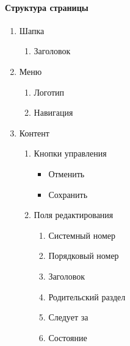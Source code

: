 \paragraph{Структура страницы}
\begin{enumerate}
	\item Шапка
	\begin{enumerate}
		\item Заголовок
	\end{enumerate}

	\item Меню
	\begin{enumerate}
		\item Логотип
		\item Навигация
	\end{enumerate}

	\item Контент
	\begin{enumerate}
		\item Кнопки управления
		\begin{itemize}
			\item Отменить
			\item Сохранить
		\end{itemize}

		\item Поля редактирования
		\begin{enumerate}
			\item Системный номер
			\item Порядковый номер
			\item Заголовок
			\item Родительский раздел
			\item Следует за
			\item Состояние
		\end{enumerate}
	\end{enumerate}
\end{enumerate}

